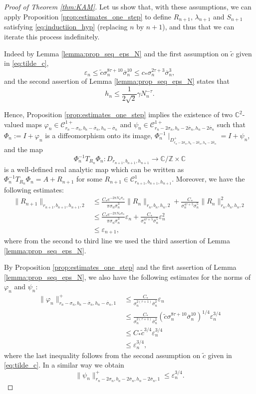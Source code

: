 \documentclass[10pt,a4paper]{amsart}
\newcommand{\C}{\mathbb{C}}
\newcommand{\Domain}[3]{D_{#1, #2, #3}}
\newcommand{\DomainP}[3]{D_{#1, #2, #3}^+}
\newcommand{\Z}{\mathbb{Z}}
\begin{document}
\begin{proof}[Proof of Theorem \ref{thm:KAM}]
Let us show that, with these assumptions, we can apply Proposition \ref{prop:estimates_one_step} to define $R_{n + 1}$, $\lambda_{n + 1}$ and $S_{n + 1}$  satisfying \eqref{eq:inductiion_hyp} (replacing $n$ by $n + 1$), and thus that we can iterate this process indefinitely.

Indeed by Lemma \ref{lemma:prop_seq_eps_N} and the first assumption on $\tilde c$ given in \eqref{eq:tilde_c}, 
\[
\varepsilon_n\leq \tilde c\sigma_n^{8\tau+10}\overline\sigma_n^{10}\leq 
c_\ast\sigma_n^{2\tau+3}\overline\sigma_n^{3},
\]
and the second assertion of Lemma \ref{lemma:prop_seq_eps_N} states that
\[
h_n\leq\frac{1}{2\sqrt 2}\gamma N_n^{-\tau}.
\]

Hence, Proposition \ref{prop:estimates_one_step} implies the existence of two $\C^2$-valued maps $\varphi_n\in\mathscr C^{1+}_{r_n-\sigma_n,b_n-\overline\sigma_n,h_n-\overline\sigma_n}$ and $\psi_n\in\mathscr C^{1+}_{r_n-2\sigma_n,b_n-2\overline\sigma_n,h_n-2\overline\sigma_n}$ such that
$\Phi_n := I+\varphi_n$ is a diffeomorphism onto its image, $\Phi^{-1}_n\mid_{\DomainP{r_n-2\sigma_n}{b_n-2\overline\sigma_n}{h_n-2\overline\sigma_n}} = I + \psi_n$, and the map 
\[
\Phi^{-1}_nT_{R_n}\Phi_n :\Domain{r_{n + 1}}{b_{n + 1}}{h_{n + 1}}  \to\C/\Z\times \C
\]
is a well-defined real analytic map which can be written as
$\Phi^{-1}_nT_{R_n}\Phi_n = A+R_{n+1}$ for some $R_{n+1}\in\mathscr C^1_{r_{n+1},b_{n+1},h_{n+1}}$.
Moreover, we have the following estimates:
\begin{align*}
\|R_{n+1}\|_{r_{n+1},b_{n+1},h_{n+1},2} 
&\leq
\frac{C_\ast e^{-2\pi N_n\sigma_n}}{\pi\sigma_n\overline \sigma_n^3}\|R_n\|_{r_n,b_n,h_n,2}+\frac{C_\ast}{\sigma_n^{4\tau+5}\overline\sigma_n^5}\|R_n\|_{r_n,b_n,h_n,2}^2\\
&\leq
\frac{C_\ast e^{-2\pi N_n\sigma_n}}{\pi\sigma_n\overline \sigma_n^3}\varepsilon_n+\frac{C_\ast}{\sigma_n^{4\tau+5}\overline\sigma_n^5}\varepsilon_n^2\\
&\leq \varepsilon_{n+1},
\end{align*}
where from the second to third line we used the third assertion of Lemma \ref{lemma:prop_seq_eps_N}. 

By Proposition \ref{prop:estimates_one_step} and the first assertion of Lemma \ref{lemma:prop_seq_eps_N}, we also have the following estimates for the norms of $\varphi_n$ and $\psi_n$:
\begin{align*}
\|\varphi_{n}\|^+_{r_{n}-\sigma_n,b_{n}-\overline\sigma_n,h_{n}-\overline\sigma_n,1} 
&\leq
\frac{C_\ast}{\sigma_n^{2(\tau+1)}\overline\sigma_n^2}\varepsilon_n\\
&\leq
\frac{C_\ast}{\sigma_n^{2(\tau+1)}\overline\sigma_n^2}(\tilde c\sigma_n^{8\tau+10}\overline\sigma_n^{10})^{1/4}
\varepsilon_n^{3/4}\\
&\leq
C_\ast\tilde c^{3/4}
\varepsilon_n^{3/4}\\
&\leq \varepsilon_{n}^{3/4},
\end{align*}
where the last inequality follows from the second assumption on $\tilde c$ given in \eqref{eq:tilde_c}. 
In a similar way we obtain
\[
\|\psi_{n}\|^+_{r_{n}-2\sigma_n,b_{n}-2\overline\sigma_n,h_{n}-2\overline\sigma_n,1} \leq \varepsilon_n^{3/4}.
\]


\end{proof}
\end{document}
